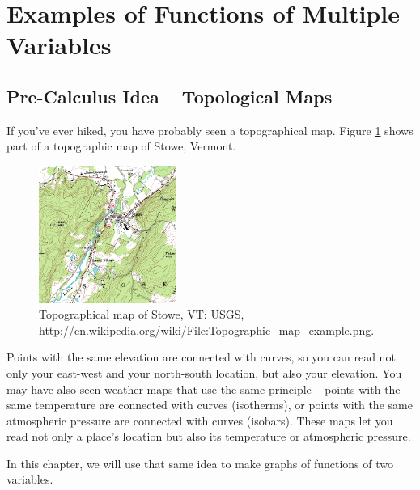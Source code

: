 \section{Examples of Functions of Multiple Variables}
\label{sec:examples}

\subsection{Pre-Calculus Idea -- Topological Maps}
If you’ve ever hiked, you have probably seen a topographical map. Figure \ref{fig:4-1-topo} shows part of a topographic map of Stowe, Vermont.

\begin{figure}[!ht]
  \centering
    \includegraphics[width=0.4\textwidth]{img/chap4/image001.png}
    \caption{Topographical map of Stowe, VT: USGS, \url{http://en.wikipedia.org/wiki/File:Topographic_map_example.png.}}
    \label{fig:4-1-topo}
\end{figure}

Points with the same elevation are connected with curves, so you can read not only your east-west and your north-south location, but also your elevation. You may have also seen weather maps that use the same principle -- points with the same temperature are connected with curves (isotherms), or points with the same atmospheric pressure are connected with curves (isobars). These maps let you read not only a place's location but also its temperature or atmospheric pressure.

In this chapter, we will use that same idea to make graphs of functions of two variables.

